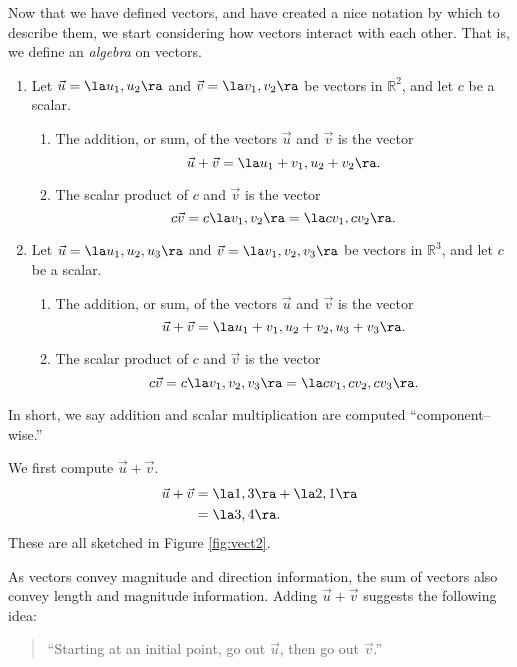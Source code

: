 Now that we have defined vectors, and have created a nice notation by which to describe them, we start considering how vectors interact with each other. That is, we define an \textit{algebra} on vectors. 
\clearpage

{\begin{enumerate}
	\item Let $\vec u = \la u_1,u_2\ra$ and $\vec v = \la v_1,v_2\ra$ be vectors in $\mathbb{R}^2$, and let $c$ be a scalar. 
				\begin{enumerate}
					\item The addition, or sum, of the vectors $\vec u$ and $\vec v$ is the vector
					$$\vec u+\vec v = \la u_1+v_1, u_2+v_2\ra.$$
					\item	The scalar product of $c$ and $\vec v$ is the vector 
					$$c\vec v = c\la v_1,v_2\ra = \la cv_1,cv_2\ra.$$
				\end{enumerate}
	\item Let $\vec u = \la u_1,u_2,u_3\ra$ and $\vec v = \la v_1,v_2,v_3\ra$ be vectors in $\mathbb{R}^3$, and let $c$ be a scalar. 
				\begin{enumerate}
					\item The addition, or sum, of the vectors $\vec u$ and $\vec v$ is the vector
					$$\vec u+\vec v = \la u_1+v_1, u_2+v_2, u_3+v_3\ra.$$
					\item	The scalar product of $c$ and $\vec v$ is the vector 
					$$c\vec v = c\la v_1,v_2,v_3\ra = \la cv_1,cv_2,cv_3\ra.$$
				\end{enumerate}
\end{enumerate}}

In short, we say addition and scalar multiplication are computed ``component--wise.''

	{We first compute $\vec u +\vec v$. 
	\begin{align*}
	\vec u+\vec v &= \la 1,3\ra + \la 2,1\ra\\
								&= \la 3,4\ra.
	\end{align*}
	These are all sketched in Figure \ref{fig:vect2}.}
	
As vectors convey magnitude and direction information, the sum of vectors also convey length and magnitude information. Adding $\vec u+\vec v$ suggests the following idea:
\begin{quotation}
``Starting at an initial point, go out $\vec u$, then go out $\vec v$.''
\end{quotation}

